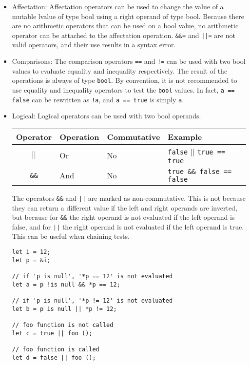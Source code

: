\begin{itemize}
\item Affectation: Affectation operators can be used to change the value of a
  mutable lvalue of type bool using a right operand of type bool. Because there
  are no arithmetic operators that can be used on a bool value, no arithmetic
  operator can be attached to the affectation operation. \texttt{\&\&=} and
  \texttt{||=} are not valid operators, and their use results in a syntax error.

\item Comparisons: The comparison operators \texttt{==} and \texttt{!=} can be
  used with two bool values to evaluate equality and inequality respectively.
  The result of the operations is always of type \texttt{bool}. By convention,
  it is not recommended to use equality and inequality operators to test the
  \texttt{bool} values. In fact, \texttt{a == false} can be rewritten as
  \texttt{!a}, and \texttt{a == true} is simply \texttt{a}.

\item Logical: Logical operators can be used with two bool operands.

  \begin{center}
    \vspace{-20pt}
    \begin{adjustbox}{max width=1.0\linewidth}
      \begin{tabular}{|c|l l l|}
        \hline
        Operator & Operation & Commutative & Example\\[0pt]
        \hline
        \hline
        \texttt{\(\vert\vert\)} & Or & No & \texttt{false} \(\vert{} \vert{}\) \texttt{true == true}\\[0pt]
        \texttt{\&\&} & And & No & \texttt{true \&\& false == false}\\[0pt]
        \hline
      \end{tabular}
    \end{adjustbox}
  \end{center}

  The operators \texttt{\&\&} and \texttt{||} are marked as non-commutative. This
  is not because they can return a different value if the left and right operands
  are inverted, but because for \texttt{\&\&} the right operand is not evaluated
  if the left operand is false, and for \texttt{||} the right operand is not
  evaluated if the left operand is true. This can be useful when chaining tests.

  \begin{lstlisting}[style=coloredverbatim]
let i = 12;
let p = &i;

// if 'p is null', '*p == 12' is not evaluated
let a = p !is null && *p == 12;

// if 'p is null', '*p != 12' is not evaluated
let b = p is null || *p != 12;

// foo function is not called
let c = true || foo ();

// foo function is called
let d = false || foo ();
  \end{lstlisting}
\end{itemize}

